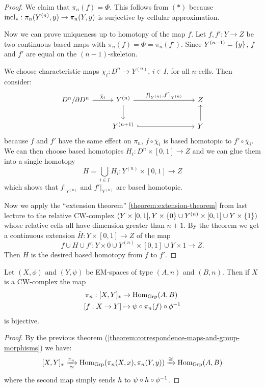 \begin{proof}
We claim that $\pi_n(f)=\Phi$. This follows from $(*)$ because $\operatorname{incl}_*:\pi_n(Y^{(n)},y)\to\pi_n(Y,y)$ is surjective by cellular approximation.

Now we can prove uniqueness up to homotopy of the map $f$. Let $f,f':Y\to Z$ be two continuous based maps with $\pi_n(f)=\Phi=\pi_n(f')$. Since $Y^{({n-1})}=\{y\}$, $f$ and $f'$ are equal on the $(n-1)$-skeleton.

We choose characteristic maps $\chi_i:D^n\to Y^{(n)}$, $i\in I$, for all $n$-cells. Then consider:
\[
\begin{tikzcd}
D^n/\de D^n \ar[r,"\bar\chi_i"] & Y^{(n)} \ar[d] \ar[r,"{f|_{Y^{(n)}},f'|_{Y^{(n)}}}"] &[20mm] Z\\
& Y^{(n+1)} \ar[r,hook] & Y \ar[u]
\end{tikzcd}
\]
because $f$ and $f'$ have the same effect on $\pi_n$, $f\circ\bar\chi_i$ is based homotopic to $f'\circ\bar\chi_i$. We can then choose based homotopies $H_i:D^n\times[0,1]\to Z$ and we can glue them into a single homotopy
\[H=\bigcup_{i\in I}H_i:Y^{(n)}\times[0,1]\to Z\]
which shows that $f|_{Y^{(n)}}$ and $f'|_{Y^{(n)}}$ are based homotopic.

Now we apply the \enquote{extension theorem} \ref{theorem:extension-theorem} from last lecture to the relative CW-complex $(Y\times[0,1],Y\times\{0\}\cup Y^{(n)}\times[0,1]\cup Y\times\{1\})$ whose relative cells all have dimension greater than $n+1$. By the theorem we get a continuous extension $\bar H:Y\times[0,1]\to Z$ of the map
\[f\cup H\cup f':Y\times0\cup Y^{(n)}\times[0,1]\cup Y\times1\to Z.\]
Then $\bar H$ is the desired based homotopy from $f$ to $f'$.
\end{proof}

\begin{theorem}\label{theorem:correspondence-maps-and-group-morphisms-EM}
Let $(X,\phi)$ and $(Y,\psi)$ be EM-spaces of type $(A,n)$ and $(B,n)$. Then if $X$ is a CW-complex the map
\begin{align*}
    \pi_n:[X,Y]_*&\to\Hom_\Grp(A,B)\\
    [f:X\to Y]&\mapsto\psi\circ\pi_n(f)\circ\phi^\inv
\end{align*}
is bijective.
\end{theorem}

\begin{proof}
By the previous theorem (\ref{theorem:correspondence-maps-and-group-morphisms}) we have:
\[
    [X,Y]_*\underset{\cong}{\xrightarrow{\pi_n}}\operatorname{Hom}_{\mathrm{Grp}}(\pi_n(X,x),\pi_n(Y,y))\xrightarrow{\cong}\operatorname{Hom}_{\mathrm{Grp}}(A,B)
\]
where the second map simply sends $h$ to $\psi\circ h\circ\phi^\inv$.
\end{proof}

